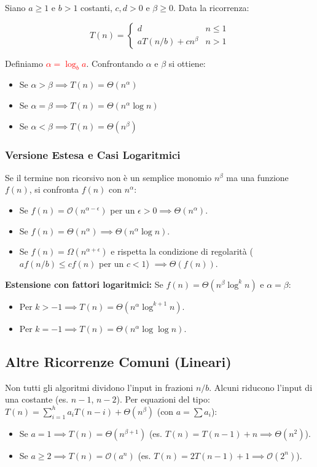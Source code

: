\documentclass[12pt, a4paper]{article}
\begin{document}
\begin{tcolorbox}[colback=lightergray!10, colframe=tocsec, title=\textbf{Teorema dell'Esperto (Versione Ridotta)}]
Siano $a \ge 1$ e $b > 1$ costanti, $c, d > 0$ e $\beta \ge 0$. Data la ricorrenza:


$$T(n) = \begin{cases} d & n \le 1 \\ aT(n/b) + cn^\beta & n > 1 \end{cases}$$


Definiamo \textcolor{red}{$\alpha = \log_b a$}. Confrontando $\alpha$ e $\beta$ si ottiene:
\begin{itemize}
\item Se $\alpha > \beta \implies T(n) = \Theta(n^\alpha)$
\item Se $\alpha = \beta \implies T(n) = \Theta(n^\alpha \log n)$
\item Se $\alpha < \beta \implies T(n) = \Theta(n^\beta)$
\end{itemize}
\end{tcolorbox}

\subsubsection{Versione Estesa e Casi Logaritmici}
Se il termine non ricorsivo non è un semplice monomio $n^\beta$ ma una funzione $f(n)$, si confronta $f(n)$ con $n^\alpha$:
\begin{itemize}
\item Se $f(n) = \mathcal{O}(n^{\alpha - \epsilon})$ per un $\epsilon > 0 \implies \Theta(n^\alpha)$.
\item Se $f(n) = \Theta(n^\alpha) \implies \Theta(n^\alpha \log n)$.
\item Se $f(n) = \Omega(n^{\alpha + \epsilon})$ e rispetta la condizione di regolarità ($a f(n/b) \le c f(n)$ per un $c<1$) $\implies \Theta(f(n))$.
\end{itemize}

\textbf{Estensione con fattori logaritmici:} Se $f(n) = \Theta(n^\beta \log^k n)$ e $\alpha = \beta$:
\begin{itemize}
\item Per $k > -1 \implies T(n) = \Theta(n^\alpha \log^{k+1} n)$.
\item Per $k = -1 \implies T(n) = \Theta(n^\alpha \log \log n)$.
\end{itemize}

\subsection{Altre Ricorrenze Comuni (Lineari)}
Non tutti gli algoritmi dividono l'input in frazioni $n/b$. Alcuni riducono l'input di una costante (es. $n-1$, $n-2$).
Per equazioni del tipo: $T(n) = \sum_{i=1}^h a_i T(n-i) + \Theta(n^\beta)$ (con $a = \sum a_i$):
\begin{itemize}
\item Se $a = 1 \implies T(n) = \Theta(n^{\beta+1})$ (es. $T(n) = T(n-1) + n \implies \Theta(n^2)$).
\item Se $a \ge 2 \implies T(n) = \mathcal{O}(a^n)$ (es. $T(n) = 2T(n-1) + 1 \implies \mathcal{O}(2^n)$).
\end{itemize}
\end{document}

